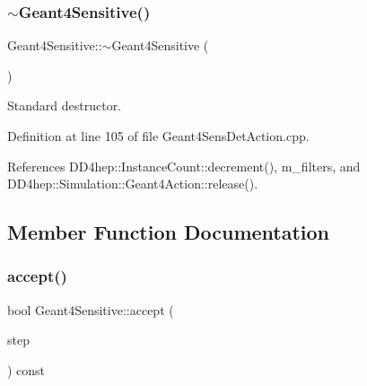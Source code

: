\hypertarget{class_d_d4hep_1_1_simulation_1_1_geant4_sensitive_ada2869ec6bcb9674eaa29f7e1c215729}{}\label{class_d_d4hep_1_1_simulation_1_1_geant4_sensitive_ada2869ec6bcb9674eaa29f7e1c215729} 
\subsubsection{\texorpdfstring{$\sim$\+Geant4\+Sensitive()}{~Geant4Sensitive()}}
{\footnotesize\ttfamily Geant4\+Sensitive\+::$\sim$\+Geant4\+Sensitive (\begin{DoxyParamCaption}{ }\end{DoxyParamCaption})\hspace{0.3cm}{\ttfamily [virtual]}}



Standard destructor. 



Definition at line 105 of file Geant4\+Sens\+Det\+Action.\+cpp.



References D\+D4hep\+::\+Instance\+Count\+::decrement(), m\+\_\+filters, and D\+D4hep\+::\+Simulation\+::\+Geant4\+Action\+::release().



\subsection{Member Function Documentation}
\hypertarget{class_d_d4hep_1_1_simulation_1_1_geant4_sensitive_ac39e0e8880a309942194e9f1b84af5a1}{}\label{class_d_d4hep_1_1_simulation_1_1_geant4_sensitive_ac39e0e8880a309942194e9f1b84af5a1} 
\subsubsection{\texorpdfstring{accept()}{accept()}}
{\footnotesize\ttfamily bool Geant4\+Sensitive\+::accept (\begin{DoxyParamCaption}\item[{const G4\+Step $\ast$}]{step }\end{DoxyParamCaption}) const}



